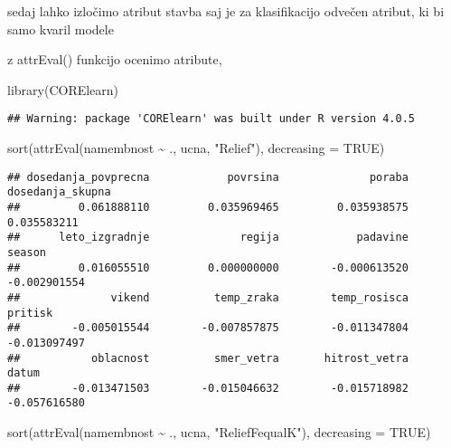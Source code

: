 \documentclass[
]{article}
\newenvironment{Shaded}{\begin{snugshade}}{\end{snugshade}}
\newcommand{\AttributeTok}[1]{\textcolor[rgb]{0.77,0.63,0.00}{#1}}
\newcommand{\ConstantTok}[1]{\textcolor[rgb]{0.00,0.00,0.00}{#1}}
\newcommand{\FunctionTok}[1]{\textcolor[rgb]{0.00,0.00,0.00}{#1}}
\newcommand{\NormalTok}[1]{#1}
\newcommand{\OtherTok}[1]{\textcolor[rgb]{0.56,0.35,0.01}{#1}}
\newcommand{\SpecialCharTok}[1]{\textcolor[rgb]{0.00,0.00,0.00}{#1}}
\newcommand{\StringTok}[1]{\textcolor[rgb]{0.31,0.60,0.02}{#1}}
\begin{document}
sedaj lahko izločimo atribut stavba saj je za klasifikacijo odvečen
atribut, ki bi samo kvaril modele

\begin{Shaded}
\end{Shaded}

z attrEval() funkcijo ocenimo atribute,

\begin{Shaded}
\begin{Highlighting}[]
\FunctionTok{library}\NormalTok{(CORElearn)}
\end{Highlighting}
\end{Shaded}

\begin{verbatim}
## Warning: package 'CORElearn' was built under R version 4.0.5
\end{verbatim}

\begin{Shaded}
\begin{Highlighting}[]
\FunctionTok{sort}\NormalTok{(}\FunctionTok{attrEval}\NormalTok{(namembnost }\SpecialCharTok{\textasciitilde{}}\NormalTok{ ., ucna, }\StringTok{"Relief"}\NormalTok{), }\AttributeTok{decreasing =} \ConstantTok{TRUE}\NormalTok{)}
\end{Highlighting}
\end{Shaded}

\begin{verbatim}
## dosedanja_povprecna            povrsina              poraba    dosedanja_skupna 
##         0.061888110         0.035969465         0.035938575         0.035583211 
##      leto_izgradnje              regija            padavine              season 
##         0.016055510         0.000000000        -0.000613520        -0.002901554 
##              vikend          temp_zraka        temp_rosisca             pritisk 
##        -0.005015544        -0.007857875        -0.011347804        -0.013097497 
##           oblacnost          smer_vetra       hitrost_vetra               datum 
##        -0.013471503        -0.015046632        -0.015718982        -0.057616580
\end{verbatim}

\begin{Shaded}
\begin{Highlighting}[]
\FunctionTok{sort}\NormalTok{(}\FunctionTok{attrEval}\NormalTok{(namembnost }\SpecialCharTok{\textasciitilde{}}\NormalTok{ ., ucna, }\StringTok{"ReliefFequalK"}\NormalTok{), }\AttributeTok{decreasing =} \ConstantTok{TRUE}\NormalTok{)}
\end{Highlighting}
\end{Shaded}
\end{document}
